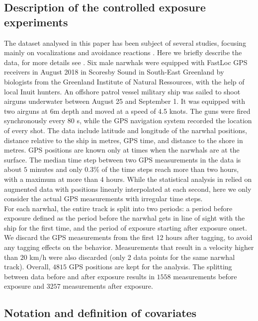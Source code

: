 \documentclass[aoas]{imsart}
\theoremstyle{definition}
\theoremstyle{remark}
\theoremstyle{remark}
\newcommand {\1}{\mathbb{1}}
\begin{document}
\subsection{Description of the controlled exposure experiments}
\label{subsection: data description}
The dataset analysed in this paper has been subject of several studies, focusing mainly on vocalizations and avoidance reactions \citep{heide-jorgensen_behavioral_2021,tervo_narwhals_2021,tervo_stuck_2023}. 
Here we briefly describe the data, for more details see \citep{heide-jorgensen_behavioral_2021}. 
Six male narwhals were equipped with FastLoc GPS receivers in August 2018 in Scoresby Sound in South-East Greenland by biologists from the Greenland Institute of Natural Ressources, with the help of local Inuit hunters. 
An offshore patrol vessel military ship was sailed to shoot airguns underwater between August 25 and September 1. It was equipped with two airguns at 6m depth and moved at a speed of 4.5 knots. The guns were fired synchronously every $80$ s, while the GPS navigation system recorded the location of every shot. 
The data include latitude and longitude of the narwhal positions, distance relative to the ship in metres, GPS time, and distance to the shore in metres. GPS positions are known only at times when the narwhals are at the surface. The median time step between two GPS measurements in the data is about $5$ minutes and only $0.3 \%$ of the time steps reach more than two hours, with a maximum at more than $4$ hours. While the statistical analysis in \citep{heide-jorgensen_behavioral_2021} relied on augmented data with positions linearly interpolated at each second, here we only consider the actual GPS measurements with irregular time steps.\\




For each narwhal, the entire track is split into two periods: a period before exposure defined as the period before the narwhal gets in line of sight with the ship for the first time, and the period of exposure starting after exposure onset. We discard the GPS measurements from the first 12 hours after tagging, to avoid any tagging effects on the behavior. Measurements that result in a velocity higher than $20$ km/h were also discarded (only 2 data points for the same narwhal track).
Overall, $4815$ GPS positions are kept for the analysis. The splitting between data before and after exposure results in $1558$ measurements before exposure and $3257$ measurements after exposure.

\subsection{Notation and definition of covariates}
\label{subsection: covariates}
\end{document}

